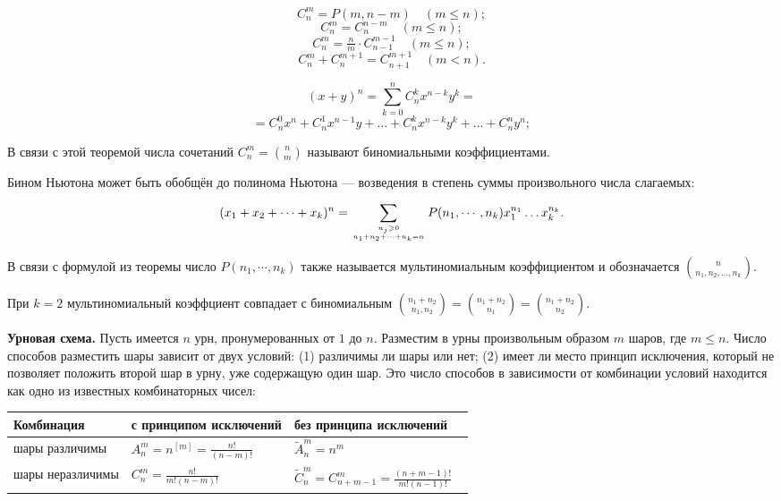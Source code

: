 \begin{theorem}
	$$C_n^m=P(m,n-m) \quad (m\leqslant n);$$
	$$C_n^m=C_n^{n-m} \quad (m\leqslant n);$$
	$$C_n^m=\tfrac{n}{m}\cdot C_{n-1}^{m-1} \quad (m\leqslant n);$$
	$$C_n^m+C_n^{m+1}=C_{n+1}^{m+1} \quad (m<n).$$
\end{theorem}


\begin{theorem}
	$$(x+y)^n = \sum_{k=0}^n C_{n}^{k} x^{n - k} y^k =$$
	$$={C_n^0}x^n + {C_n^1}x^{n - 1}y + \ldots + {C_n^k}x^{n - k}y^k + \ldots + {C_n^n}y^n;$$
\end{theorem}

В связи с этой теоремой числа сочетаний $C_n^m=\binom{n}{m}$ называют биномиальными коэффициентами.

Бином Ньютона может быть обобщён до полинома Ньютона --- возведения в степень суммы произвольного числа слагаемых:
\begin{theorem}
	$$(x_1 + x_2 + \cdots + x_k)^n =\sum\limits_{n_j \geqslant 0 \atop n_1 + n_2 + \cdots + n_k = n} P(n_1, \cdots, n_k) x_1^{n_1} \ldots x_k^{n_k}.$$
\end{theorem}

В связи с формулой из теоремы число $P(n_1,  \cdots, n_k)$ также называется мультиномиальным коэффициентом и обозначается  $\binom{n}{n_1, n_2, \ldots, n_k}$.
\medskip

При $k=2$ мультиномиальный коэффциент совпадает с биномиальным $\binom{n_1+n_2}{n_1, n_2}=\binom{n_1+n_2}{n_1}=\binom{n_1+n_2}{n_2}$.
\bigskip

\textbf{Урновая схема.}
Пусть имеется $n$ урн, пронумерованных от $1$ до $n$. 
Разместим в урны произвольным образом $m$ шаров, где $m\leqslant n$.
Число способов разместить шары зависит от двух условий: (1) различимы ли шары или нет; (2) имеет ли место принцип исключения, который не позволяет положить второй шар в урну, уже содержащую один шар. 
Это число способов в зависимости от комбинации условий находится как одно из известных комбинаторных чисел:
\bigskip

\begin{tabular}[c]{|p{5em}|p{10em}|p{12.5em}|}
	\hline
	\scriptsize{Комбинация} & \scriptsize{с принципом исключений} & \scriptsize{без принципа исключений}  \\ \hline
	\scriptsize{шары различимы}    & $A_n^m=n^{[m]}={\frac{n!}{(n-m)!}}^{\phantom{M}}$ & $\widetilde{A}_n^m=n^m$\phantom{MMMMMMMMM} \\ \hline
	\scriptsize{шары неразличимы}  & $C_n^m=\frac{n!}{m!(n-m)!}$\phantom{MMMM}    & $\widetilde{C}_n^m=C_{n+m-1}^m={\frac{(n+m-1)!}{m!(n-1)!}}^{\phantom{M}}$ \\ \hline
\end{tabular}
\bigskip

